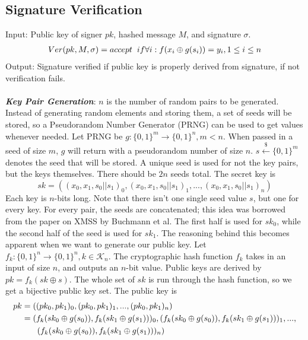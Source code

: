 \documentclass[]{scrartcl}
\makeatletter
\newcommand{\mathcenter}{\@fleqnfalse}
\makeatother
\begin{document}
\subsection*{Signature Verification}
Input: Public key of signer $pk$, hashed message $M$, and signature $\sigma$.
\mathcenter
\begin{equation}
\begin{split}
Ver(pk, M, \sigma) =accept \hspace{0.2cm} if \forall i : f(x_i \oplus g(s_i)) = y_i, 1 \leq i \leq n
\end{split}
\end{equation}
Output: Signature verified if public key is properly derived from signature, if not verification fails.\\ \\
\textbf{\textit{Key Pair Generation}}: $n$ is the number of random pairs to be generated. Instead of generating random elements and storing them, a set of seeds will be stored, so a Pseudorandom Number Generator (PRNG) can be used to get values whenever needed. Let PRNG be $g : \{0,1\}^m \rightarrow \{0,1\}^n, m < n$. When passed in a seed of size $m$, $g$ will return with a pseudorandom number of size $n$. $s \xleftarrow{\$} \{0,1\}^m$ denotes the seed that will be stored. A unique seed is used for not the key pairs, but the keys themselves. There should be $2n$ seeds total. The secret key is 
\mathcenter
\begin{equation}
sk = ((x_0, x_1, s_0||s_1)_0,(x_0, x_1, s_0||s_1)_1,...,(x_0, x_1, s_0||s_1)_n) 
\end{equation}
Each key is $n$-bits long. Note that there isn't one single seed value $s$, but one for every key. For every pair, the seeds are concatenated; this idea was borrowed from the paper on XMSS by Buchmann et al. The first half is used for $sk_0$, while the second half of the seed is used for $sk_1$. The reasoning behind this becomes apparent when we want to generate our public key. Let $f_k : \{0,1\}^n \rightarrow \{0,1\}^n, k \in \mathcal{K}_n$. The cryptographic hash function $f_k$ takes in an input of size $n$, and outputs an $n$-bit value. Public keys are derived by $pk = f_k(sk \oplus s)$. The whole set of $sk$ is run through the hash function, so we get a bijective public key set. The public key is
\mathcenter
\begin{equation}
	\begin{split}
		pk & = ((pk_0, pk_1)_0,(pk_0, pk_1)_1,...,(pk_0, pk_1)_n) \\
		& = (f_k(sk_0 \oplus g(s_0)), f_k(sk_1 \oplus g(s_1)))_0,(f_k(sk_0 \oplus g(s_0)), f_k(sk_1 \oplus g(s_1)))_1,...,\\
		& \hspace{0.65cm}(f_k(sk_0 \oplus g(s_0)), f_k(sk_1 \oplus g(s_1)))_n) 
	\end{split}
\end{equation}
\end{document}
